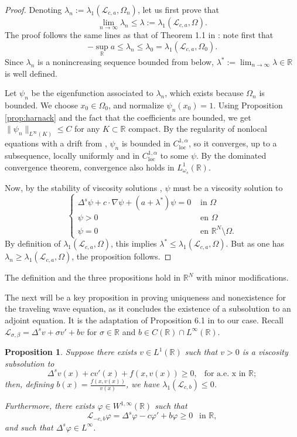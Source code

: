 \documentclass[11pt,a4paper]{amsart}
\newcommand{\Lop}{\mathcal{L}}
\newcommand{\R}{\mathbb{R}}
\newcommand{\inSet}[1]{\text{ in } {#1}}
\newcommand{\Cloc}{C_{\mathrm{loc}}}
\newcommand{\Lomega}{L^1_{\omega_s}(\R)}
\renewcommand{\phi}{\varphi}
\newtheorem{prop}[thm]{Proposition}
\begin{document}
\begin{proof}
Denoting $\lambda_n:= \lambda_1(\Lop_{c,a}, \Omega_n)$, let us first prove that
\begin{equation}
\label{eq:leftineq}
\lim_{n\rightarrow\infty} \lambda_n \leq \lambda:= \lambda_1(\Lop_{c,a},\Omega).
\end{equation}
The proof follows the same lines as that of Theorem 1.1 in \cite{DQT23}: note first that
\[-\sup_{\R} a \leq \lambda_n \leq \lambda_0 = \lambda_1(\Lop_{c,a}, \Omega_0).\]
Since $\lambda_n$ is a nonincreasing sequence bounded from below, $\lambda^* := \lim_{n\rightarrow \infty} \lambda \in \R$ is well defined.
 
Let $\psi_n$ be the eigenfunction associated to $\lambda_n$, which exists because $\Omega_n$ is bounded. We choose $x_0 \in \Omega_0$, and normalize $\psi_n(x_0)= 1$. Using Proposition \ref{prop:harnack} and the fact that the coefficients are bounded, we get $\|\psi_n \|_{L^{\infty}(K)} \leq C$ for any $K\subset \R$ compact. By the regularity of nonlocal equations with a drift from \cite{CL12}, $\psi_n$ is bounded in $\Cloc^{1,\alpha}$, so it converges, up to a subsequence, locally uniformly and in $\Cloc^{1,\alpha}$ to some $\psi$. By the dominated convergence theorem, convergence also holds in $\Lomega$. 

Now, by the stability of viscosity solutions \cite{CL12}, $\psi$ must be a viscosity solution to
\[\begin{cases}
\Delta^s\psi + c \cdot \nabla \psi + (a + \lambda^*) \psi = 0 & \inSet{\Omega}\\
\psi > 0 & \text{ en } \Omega \\
\psi = 0 & \text{ en } \R^N \setminus \Omega.
\end{cases}\]
By definition of $\lambda_1(\Lop_{c,a},\Omega)$, this implies $\lambda^* \leq \lambda_1(\Lop_{c,a},\Omega)$. But as one has $\lambda_n \geq \lambda_1(\Lop_{c,a},\Omega)$, the proposition follows.
\end{proof}

The definition and the three propositions hold in $\R^N$ with minor modifications.

The next will be a key proposition in proving uniqueness and nonexistence for the traveling wave equation, as it concludes the existence of a subsolution to an adjoint equation. It is the adaptation of Proposition 6.1 in \cite{C21} to our case. Recall $\Lop_{\sigma,\beta} = \Delta^s v + \sigma v' + bv$ for $\sigma \in \R$ and $b\in C(\R) \cap L^{\infty}(\R)$.
\begin{prop}
\label{prop:subsol}
Suppose there exists $v\in L^1(\R)$ such that $v>0$ is a viscosity subsolution to 
\begin{equation}
\label{eq:subsol}
\Delta^s v(x) + c v'(x) + f(x,v(x)) \geq 0,~~\text{ for a.e. x in }\R;
\end{equation}
then, defining $b(x)=\frac{f(x,v(x))}{v(x)}$, we have $\lambda_1(\Lop_{c,b})\leq 0$.

Furthermore, there exists $\phi\in W^{1,\infty}(\R)$ such that
\[\Lop_{-c,b}\phi = \Delta^s \phi-c\phi' +b\phi \geq 0~~\text{ in }\R, \]
and such that $\Delta^s\phi \in L^{\infty}$.
\end{prop}
\end{document}
